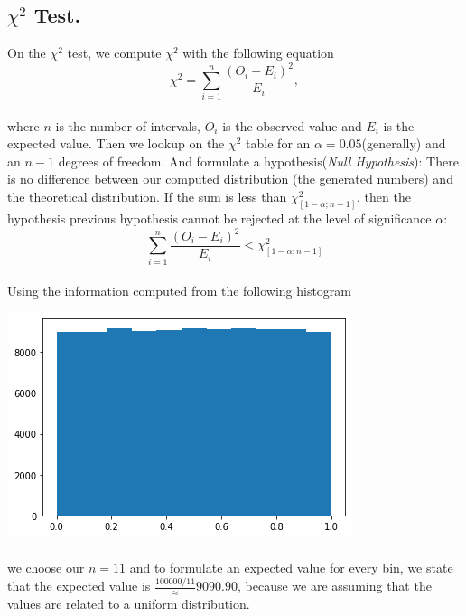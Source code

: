\documentclass{article}
\begin{document}
\subsection{$\chi^2$ Test.}
On the $\chi^2$ test, we compute $\chi^2$ with the following equation
\begin{equation}
\chi^2 = \sum_{i=1}^{n} \frac{(O_i - E_i)^2}{E_i},
\end{equation}
\paragraph{}where $n$ is the number of intervals, $O_i$ is the observed value and $E_i$ is the expected value. Then we lookup on the $\chi^2$ table for an $\alpha=0.05$(generally) and an $n-1$ degrees of freedom. And formulate a hypothesis(\textit{Null Hypothesis}): There is no difference between our computed distribution (the generated numbers) and the theoretical distribution. If the sum is less than $\chi^2_{[1-\alpha;n-1]}$, then the hypothesis previous hypothesis cannot be rejected at the level of significance $\alpha$:
$$\sum_{i=1}^{n} \frac{(O_i - E_i)^2}{E_i} < \chi^2_{[1-\alpha;n-1]}$$
\paragraph{}Using the information computed from the following histogram
\begin{center}
	\includegraphics[width=0.5\linewidth]{histogram2.png}
\end{center}
\paragraph{}we choose our $n=11$ and to formulate an expected value for every bin, we state that the expected value is $\frac{100000/11} \approx 9090.90$, because we are assuming that the values are related to a uniform distribution.
\newpage
\end{document}
